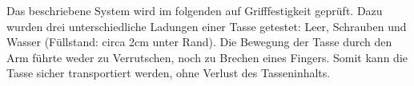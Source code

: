 Das beschriebene System wird im folgenden auf Grifffestigkeit geprüft. Dazu wurden drei unterschiedliche Ladungen einer Tasse getestet: Leer, Schrauben und Wasser (Füllstand: circa 2cm unter Rand). Die Bewegung der Tasse durch den Arm führte weder zu Verrutschen, noch zu Brechen eines Fingers. Somit kann die Tasse sicher transportiert werden, ohne Verlust des Tasseninhalts.
